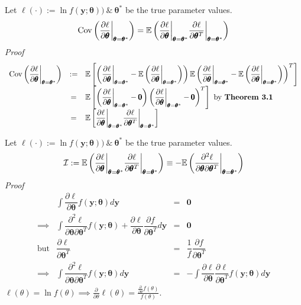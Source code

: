 \documentclass[11pt,a4paper]{article}
\begin{document}
Let $\ell(\cdot):=\ln f(\textbf{y};\pmb\theta))\ \&\ \pmb\theta^*$ be the true parameter values.
$$\mathrm{Cov}\left(\dfrac{\partial\ell}{\partial\pmb\theta}\bigg|_{\pmb\theta=\pmb\theta^*}\right)=\mathbb{E}\left(\dfrac{\partial\ell}{\partial\pmb\theta}\bigg|_{\pmb\theta=\pmb\theta^*}\dfrac{\partial\ell}{\partial\pmb\theta^T}\bigg|_{\pmb\theta=\pmb\theta^*}\right)$$
\textit{Proof}\\
\[\begin{array}{rcl}
\mathrm{Cov}\left(\dfrac{\partial\ell}{\partial\pmb\theta}\bigg|_{\pmb\theta=\pmb\theta^*}\right)&:=&\mathbb{E}\left[\left(\dfrac{\partial\ell}{\partial\pmb\theta}\bigg|_{\pmb\theta=\pmb\theta^*}-\mathbb{E}\left(\dfrac{\partial\ell}{\partial\pmb\theta}\bigg|_{\pmb\theta=\pmb\theta^*}\right)\right)\mathbb{E}\left(\dfrac{\partial\ell}{\partial\pmb\theta}\bigg|_{\pmb\theta=\pmb\theta^*}-\mathbb{E}\left(\dfrac{\partial\ell}{\partial\pmb\theta}\bigg|_{\pmb\theta=\pmb\theta^*}\right)\right)^T\right]\\
&=&\mathbb{E}\left[\left(\dfrac{\partial\ell}{\partial\pmb\theta}\bigg|_{\pmb\theta=\pmb\theta^*}-\pmb0\right)\left(\dfrac{\partial\ell}{\partial\pmb\theta}\bigg|_{\pmb\theta=\pmb\theta^*}-\pmb0\right)^T\right]\text{ by \textbf{Theorem 3.1}}\\
&=&\mathbb{E}\left[\dfrac{\partial\ell}{\partial\pmb\theta}\bigg|_{\pmb\theta=\pmb\theta^*}\dfrac{\partial\ell}{\partial\pmb\theta^T}\bigg|_{\pmb\theta=\pmb\theta^*}\right]
\end{array}\]
\proved

Let $\ell(\cdot):=\ln f(\textbf{y};\pmb\theta))\ \&\ \pmb\theta^*$ be the true parameter values.
$$\mathcal{I}:=\mathbb{E}\left(\dfrac{\partial\ell}{\partial\pmb\theta}\bigg|_{\pmb\theta=\pmb\theta^*}\dfrac{\partial\ell}{\partial\pmb\theta^T}\bigg|_{\pmb\theta=\pmb\theta^*}\right)\equiv-\mathbb{E}\left(\dfrac{\partial^2\ell}{\partial\pmb\theta\partial\pmb\theta^T}\bigg|_{\pmb\theta=\pmb\theta^*}\right)$$
\textit{Proof}
\[\begin{array}{rrcl}
&\displaystyle\int\dfrac{\partial\ell}{\partial\pmb\theta}f(\textbf{y};\pmb\theta)d\textbf{y}&=&\pmb0\\
\implies&\displaystyle\int\dfrac{\partial^2\ell}{\partial\pmb\theta\partial\pmb\theta^T}f(\textbf{y};\pmb\theta)+\dfrac{\partial\ell}{\partial\pmb\theta}\dfrac{\partial f}{\partial\pmb\theta^T}d\textbf{y}&=&\pmb0\\
\text{but}&\dfrac{\partial\ell}{\partial\pmb\theta^T}&=&\dfrac1f\dfrac{\partial f}{\partial\pmb\theta^T}\\
\implies&\displaystyle\int\dfrac{\partial^2\ell}{\partial\pmb\theta\partial\pmb\theta^T}f(\textbf{y};\pmb\theta)d\textbf{y}&=&-\displaystyle\int\dfrac{\partial\ell}{\partial\pmb\theta}\dfrac{\partial\ell}{\partial\pmb\theta^T}f(\textbf{y};\pmb\theta)d\textbf{y}
\end{array}\]
\proved
\nb $\ell(\theta)=\ln f(\theta)\implies\frac{\partial}{\partial\theta}\ell(\theta)=\frac{\frac\partial{\partial\theta}f(\theta)}{f(\theta)}$.\\
\end{document}
